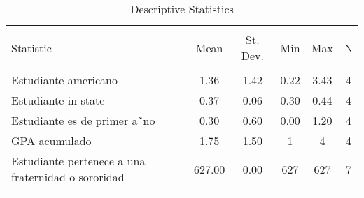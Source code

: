 
\begin{table}[!htbp] \centering 
  \caption{Descriptive Statistics} 
  \label{} 
\begin{tabular}{@{\extracolsep{5pt}}lccccc} 
\\[-1.8ex]\hline 
\hline \\[-1.8ex] 
Statistic & \multicolumn{1}{c}{Mean} & \multicolumn{1}{c}{St. Dev.} & \multicolumn{1}{c}{Min} & \multicolumn{1}{c}{Max} & \multicolumn{1}{c}{N} \\ 
\hline \\[-1.8ex] 
Estudiante americano & 1.36 & 1.42 & 0.22 & 3.43 & 4 \\ 
Estudiante in-state & 0.37 & 0.06 & 0.30 & 0.44 & 4 \\ 
Estudiante es de primer a˜no & 0.30 & 0.60 & 0.00 & 1.20 & 4 \\ 
GPA acumulado & 1.75 & 1.50 & 1 & 4 & 4 \\ 
Estudiante pertenece a una fraternidad o sororidad & 627.00 & 0.00 & 627 & 627 & 7 \\ 
\hline \\[-1.8ex] 
\end{tabular} 
\end{table} 
